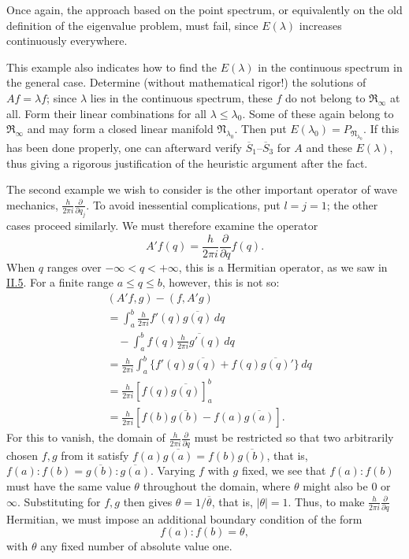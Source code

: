 \documentclass[fontsize=13pt,twoside,openany,headings=normal,parskip=false,bookmarkpackage=false,DIV=calc]{scrbook}
\begin{document}
\hypertarget{origpage-68}{}%
Once again, the approach based on the point spectrum, or equivalently on the old definition of the eigenvalue problem, must fail, since $E(\lambda)$ increases continuously everywhere.

This example also indicates how to find the $E(\lambda)$ in the continuous spectrum in the general case. Determine (without mathematical rigor!) the solutions of $Af=\lambda f$; since $\lambda$ lies in the continuous spectrum, these $f$ do not belong to $\mathfrak{R}_\infty$ at all. Form their linear combinations for all $\lambda\leq\lambda_0$. Some of these again belong to $\mathfrak{R}_\infty$ and may form a closed linear manifold $\mathfrak{N}_{\lambda_0}$. Then put $E(\lambda_0)=P_{\mathfrak{N}_{\lambda_0}}$. If this has been done properly, one can afterward verify $\hyperref[cond:II.Sbar1]{\overline{S}_1}$--$\hyperref[cond:II.Sbar3]{\overline{S}_3}$ for $A$ and these $E(\lambda)$, thus giving a rigorous justification of the heuristic argument after the fact.

The second example we wish to consider is the other important operator of wave mechanics, $\frac{h}{2\pi i}\frac{\partial}{\partial q_j}$. To avoid inessential complications, put $l=j=1$; the other cases proceed similarly. We must therefore examine the operator
\[
A'f(q)=\frac{h}{2\pi i}\frac{\partial}{\partial q}f(q).
\]
When $q$ ranges over $-\infty<q<+\infty$, this is a Hermitian operator, as we saw in \hyperref[sec:II.5]{II.5}. For a finite range $a\leq q\leq b$, however, this is not so:
\begin{align*}
&(A'f,g)-(f,A'g)\\
&=\int_a^b\frac{h}{2\pi i}f'(q)\overline{g(q)}\,dq\\
&\quad-\int_a^b f(q)\overline{\frac{h}{2\pi i}g'(q)}\,dq\\
&=\frac{h}{2\pi i}\int_a^b\{f'(q)\overline{g(q)}+f(q)\overline{g(q)}'\}\,dq\\
&=\frac{h}{2\pi i}[f(q)\overline{g(q)}]_a^b\\
&=\frac{h}{2\pi i}[f(b)\overline{g(b)}-f(a)\overline{g(a)}].
\end{align*}
For this to vanish, the domain of $\frac{h}{2\pi i}\frac{\partial}{\partial q}$ must be restricted so that two arbitrarily chosen $f,g$ from it satisfy $f(a)\overline{g(a)}=f(b)\overline{g(b)}$, that is, $f(a):f(b)=\overline{g(b)}:\overline{g(a)}$. Varying $f$ with $g$ fixed, we see that $f(a):f(b)$ must have the same value $\theta$ throughout the domain, where $\theta$ might also be $0$ or $\infty$. Substituting for $f,g$ then gives $\theta=1/\overline\theta$, that is, $|\theta|=1$. Thus, to make $\frac{h}{2\pi i}\frac{\partial}{\partial q}$ Hermitian, we must impose an additional boundary condition of the form
\[
f(a):f(b)=\theta,
\]
with $\theta$ any fixed number of absolute value one.
\end{document}
